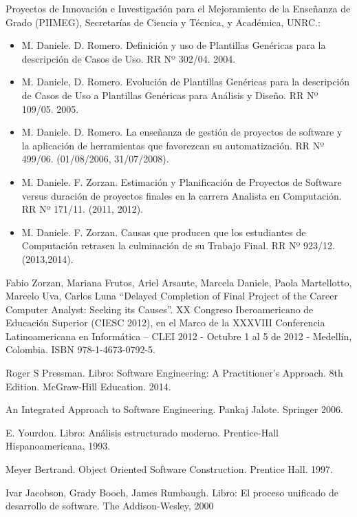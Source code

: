 
\begin{thebibliography}{10}

Proyectos de Innovación e Investigación para el Mejoramiento de la Enseñanza de Grado (PIIMEG), Secretarías de Ciencia y Técnica, y Académica, UNRC.:
\begin{itemize}
 \item M. Daniele. D. Romero. Definición y uso de Plantillas Genéricas para la descripción de Casos de Uso. RR Nº 302/04. 2004. 
 \item M. Daniele, D. Romero. Evolución de Plantillas Genéricas para la descripción de Casos de Uso a Plantillas Genéricas para Análisis y Diseño. RR Nº 109/05. 2005. 
 \item M. Daniele. D. Romero. La enseñanza de gestión de proyectos de software y la aplicación de herramientas que favorezcan su automatización. RR Nº 499/06. (01/08/2006, 31/07/2008).
 \item M. Daniele. F. Zorzan. Estimación y Planificación de Proyectos de Software versus duración de proyectos finales en la carrera Analista en Computación. RR Nº 171/11. (2011, 2012).
 \item M. Daniele. F. Zorzan. Causas que producen que los estudiantes de Computación retrasen la culminación de su Trabajo Final. RR Nº 923/12. (2013,2014).
\end{itemize}

Fabio Zorzan, Mariana Frutos, Ariel Arsaute, Marcela Daniele, Paola Martellotto, Marcelo Uva, Carlos Luna “Delayed Completion of Final Project of the Career Computer Analyst: Seeking its Causes”. XX Congreso Iberoamericano de Educación Superior (CIESC 2012), en el Marco de la XXXVIII Conferencia Latinoamericana en Informática – CLEI 2012 - Octubre 1 al 5 de 2012 - Medellín, Colombia. ISBN 978-1-4673-0792-5.

Roger S Pressman. Libro: Software Engineering: A Practitioner's Approach. 8th Edition. McGraw-Hill Education. 2014.

An Integrated Approach to Software Engineering. Pankaj Jalote. Springer 2006. 

E. Yourdon. Libro: Análisis estructurado moderno. Prentice-Hall Hispanoamericana, 1993.

 Meyer Bertrand. Object Oriented Software Construction. Prentice Hall. 1997.

Ivar Jacobson, Grady Booch, James Rumbaugh. Libro: El proceso unificado de desarrollo de software. The Addison-Wesley, 2000


\end{thebibliography}
